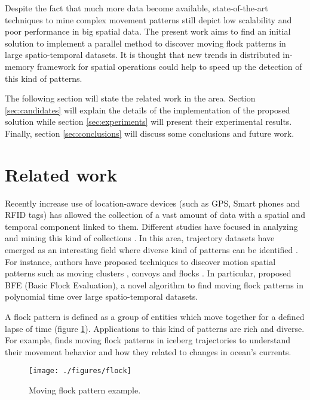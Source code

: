 \documentclass[12pt]{scrartcl}
\begin{document}
Despite the fact that much more data become available, state-of-the-art techniques to mine complex movement patterns still depict low scalability and poor performance in big spatial data.  The present work aims to find an initial solution to implement a parallel method to discover moving flock patterns in large spatio-temporal datasets.  It is thought that new trends in distributed in-memory framework for spatial operations could help to speed up the detection of this kind of patterns.

The following section will state the related work in the area.  Section \ref{sec:candidates} will explain the details of the implementation of the proposed solution while section \ref{sec:experiments} will present their experimental results. Finally, section \ref{sec:conclusions} will discuss some conclusions and future work. 

\section{Related work}
Recently increase use of location-aware devices (such as GPS, Smart phones and RFID tags) has allowed the collection of a vast amount of data with a spatial and temporal component linked to them.  Different studies have focused in analyzing and mining this kind of collections \citep{leung_knowledge_2010, miller_geographic_2001}.  In this area, trajectory datasets have emerged as an interesting field where diverse kind of patterns can be identified \citep{zheng_computing_2011, vieira_spatio-temporal_2013}.  For instance, authors have proposed techniques to discover motion spatial patterns such as moving clusters \citep{kalnis_discovering_2005}, convoys \citep{jeung_discovery_2008} and flocks \citep{benkert_reporting_2008, gudmundsson_computing_2006}.  In particular, \cite{vieira_-line_2009} proposed BFE (Basic Flock Evaluation), a novel algorithm to find moving flock patterns in polynomial time over large spatio-temporal datasets.  
 
A flock pattern is defined as a group of entities which move together for a defined lapse of time \citep{benkert_reporting_2008} (figure \ref{fig:flock}).  Applications to this kind of patterns are rich and diverse.  For example, \citep{calderon_romero_mining_2011} finds moving flock patterns in iceberg trajectories to understand their movement behavior and how they related to changes in ocean's currents. 

\begin{figure}
 \centering
 \texttt{[image: ./figures/flock]}
 \caption{Moving flock pattern example.}
 \label{fig:flock}
\end{figure}
 
\end{document}
